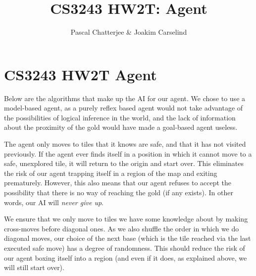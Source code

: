 \documentclass[11pt,a4paper]{article}
\author{Pascal Chatterjee & Joakim Carselind}
\title{CS3243 HW2T: Agent}
\begin{document}
 

\section*{CS3243 HW2T Agent}

Below are the algorithms that make up the AI for our agent. We chose to use a model-based agent, as a purely reflex based agent would not take advantage of the possibilities of logical inference in the world, and the lack of information about the proximity of the gold would have made a goal-based agent useless.

The agent only moves to tiles that it knows are safe, and that it has not visited previously. If the agent ever finds itself in a position in which it cannot move to a safe, unexplored tile, it will return to the origin and start over. This eliminates the risk of our agent trapping itself in a region of the map and exiting prematurely. However, this also means that our agent refuses to accept the possibility that there is no way of reaching the gold (if any exists). In other words, our AI will \textit{never give up}.  

We ensure that we only move to tiles we have some knowledge about by making cross-moves before diagonal ones. As we also shuffle the order in which we do diagonal moves, our choice of the next base (which is the tile reached via the last executed safe move) has a degree of randomness. This should reduce the risk of our agent boxing itself into a region (and even if it does, as explained above, we will still start over).  

\listofalgorithms 
\end{document}
